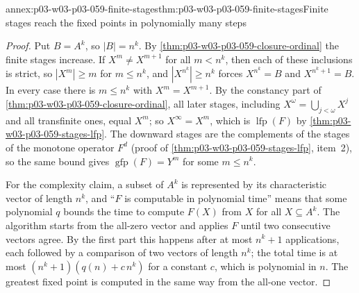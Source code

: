 \begin{annexitem}{annex:p03-w03-p03-059-finite-stages}{thm:p03-w03-p03-059-finite-stages}{Finite stages reach the fixed points in polynomially many steps}
\begin{proof}
Put \(B=A^k\), so \(|B|=n^k\). By
\cref{thm:p03-w03-p03-059-closure-ordinal} the finite stages increase. If
\(X^m\neq X^{m+1}\) for all \(m<n^k\), then each of these inclusions is
strict, so \(|X^m|\geq m\) for \(m\leq n^k\), and
\(|X^{n^k}|\geq n^k\) forces \(X^{n^k}=B\) and \(X^{n^k+1}=B\). In every case
there is \(m\leq n^k\) with \(X^m=X^{m+1}\). By the constancy part of
\cref{thm:p03-w03-p03-059-closure-ordinal}, all later stages, including
\(X^\omega=\bigcup_{j<\omega}X^j\) and all transfinite ones, equal \(X^m\);
so \(X^\infty=X^m\), which is \(\operatorname{lfp}(F)\) by
\cref{thm:p03-w03-p03-059-stages-lfp}. The downward stages are the
complements of the stages of the monotone operator \(F^d\) (proof of
\cref{thm:p03-w03-p03-059-stages-lfp}, item~2), so the same bound gives
\(\operatorname{gfp}(F)=Y^m\) for some \(m\leq n^k\).

For the complexity claim, a subset of \(A^k\) is represented by its
characteristic vector of length \(n^k\), and ``\(F\) is computable in
polynomial time'' means that some polynomial \(q\) bounds the time to compute
\(F(X)\) from \(X\) for all \(X\subseteq A^k\). The algorithm starts from
the all-zero vector and applies \(F\) until two consecutive vectors agree.
By the first part this happens after at most \(n^k+1\) applications, each
followed by a comparison of two vectors of length \(n^k\); the total time
is at most \((n^k+1)(q(n)+c\,n^k)\) for a constant \(c\), which is
polynomial in \(n\). The greatest fixed point is computed in the same way
from the all-one vector.
\end{proof}
\end{annexitem}

